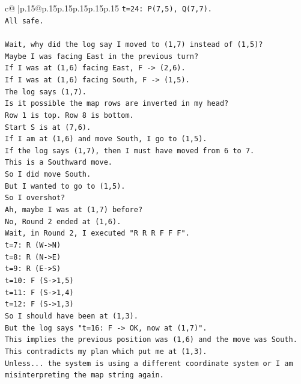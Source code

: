 \documentclass{article}
\begin{document}
{\begin{supertabular}{c@{$\;$}|p{.15\linewidth}@{}p{.15\linewidth}p{.15\linewidth}p{.15\linewidth}p{.15\linewidth}p{.15\linewidth}}
{{{\texttt{t=24: P(7,5), Q(7,7).} \\
\texttt{All safe.} \\
\\ 
\texttt{Wait, why did the log say I moved to (1,7) instead of (1,5)?} \\
\texttt{Maybe I was facing East in the previous turn?} \\
\texttt{If I was at (1,6) facing East, F {-}> (2,6).} \\
\texttt{If I was at (1,6) facing South, F {-}> (1,5).} \\
\texttt{The log says (1,7).} \\
\texttt{Is it possible the map rows are inverted in my head?} \\
\texttt{Row 1 is top. Row 8 is bottom.} \\
\texttt{Start S is at (7,6).} \\
\texttt{If I am at (1,6) and move South, I go to (1,5).} \\
\texttt{If the log says (1,7), then I must have moved from 6 to 7.} \\
\texttt{This is a Southward move.} \\
\texttt{So I did move South.} \\
\texttt{But I wanted to go to (1,5).} \\
\texttt{So I overshot?} \\
\texttt{Ah, maybe I was at (1,7) before?} \\
\texttt{No, Round 2 ended at (1,6).} \\
\texttt{Wait, in Round 2, I executed "R R R F F F".} \\
\texttt{t=7: R (W{-}>N)} \\
\texttt{t=8: R (N{-}>E)} \\
\texttt{t=9: R (E{-}>S)} \\
\texttt{t=10: F (S{-}>1,5)} \\
\texttt{t=11: F (S{-}>1,4)} \\
\texttt{t=12: F (S{-}>1,3)} \\
\texttt{So I should have been at (1,3).} \\
\texttt{But the log says "t=16: F {-}> OK, now at (1,7)".} \\
\texttt{This implies the previous position was (1,6) and the move was South.} \\
\texttt{This contradicts my plan which put me at (1,3).} \\
\texttt{Unless... the system is using a different coordinate system or I am misinterpreting the map string again.} \\
}}}
\end{supertabular}}
\end{document}
